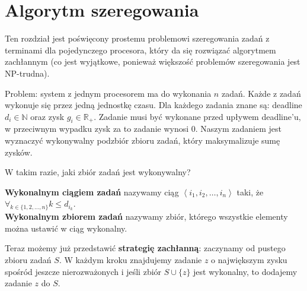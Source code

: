 \section{Algorytm szeregowania}

\label{sec:szeregowanie}

Ten rozdział jest poświęcony prostemu problemowi szeregowania zadań z terminami dla pojedynczego procesora, który da się rozwiązać algorytmem zachłannym (co jest wyjątkowe, ponieważ większość problemów szeregowania jest NP-trudna).

Problem: system z jednym procesorem ma do wykonania $n$ zadań.
Każde z zadań wykonuje się przez jedną jednostkę czasu.
Dla każdego zadania znane są: deadline $d_i \in \mathbb{N}$ oraz zysk $g_i \in \mathbb{R}_{+}$.
Zadanie musi być wykonane przed upływem deadline'u, w przeciwnym wypadku zysk za to zadanie wynosi 0.
Naszym zadaniem jest wyznaczyć wykonywalny podzbiór zbioru zadań, który maksymalizuje sumę zysków.

W takim razie, jaki zbiór zadań jest wykonywalny?

\begin{definition}
\textbf{Wykonalnym ciągiem zadań} nazywamy ciąg $\left\langle i_1, i_2, \dots, i_n \right\rangle$ taki, że $\forall_{k \in \{1, 2, \dots, n\}} k \leq d_{i_k}$. \\
\textbf{Wykonalnym zbiorem zadań} nazywamy zbiór, którego wszystkie elementy można ustawić w ciąg wykonalny.
\end{definition}

Teraz możemy już przedstawić \textbf{strategię zachłanną}: zaczynamy od pustego zbioru zadań $S$.
W każdym kroku znajdujemy zadanie $z$ o największym zysku spośród jeszcze nierozważonych i jeśli zbiór $S \cup \{z\}$ jest wykonalny, to dodajemy zadanie $z$ do $S$.


